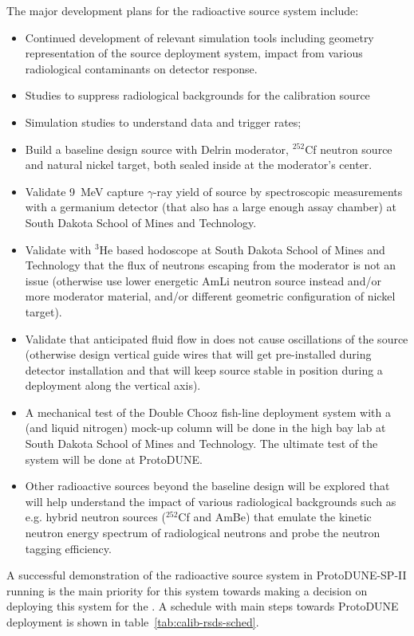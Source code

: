 The major development plans for the radioactive source system include:
\begin{itemize}
\item Continued development of relevant simulation tools including geometry representation of the source deployment system, impact from various radiological contaminants on detector response. 
\item Studies to suppress radiological backgrounds for the calibration source
\item Simulation studies to understand data and trigger rates;
\item Build a baseline design source with Delrin moderator, $^{252}$Cf neutron source and natural nickel target, both sealed inside at the moderator's center.
\item Validate \SI{9}{\MeV} capture $\gamma$-ray yield of source by spectroscopic measurements with a germanium detector (that also has a large enough assay chamber) at South Dakota School of Mines and Technology.
\item Validate with $^{3}$He based hodoscope at South Dakota School of Mines and Technology that the flux of neutrons escaping from the moderator is not an issue (otherwise use lower energetic AmLi neutron source instead and/or more moderator material, and/or different geometric configuration of nickel target). 
\item Validate that anticipated fluid flow in  does not cause oscillations of the source (otherwise design vertical guide wires that will get pre-installed during detector installation and that will keep source stable in position during a deployment along the vertical axis).
\item A mechanical test of the Double Chooz fish-line deployment system with a  (and liquid nitrogen) mock-up column will be done in the high bay lab at South Dakota School of Mines and Technology. The ultimate test of the system will be done at ProtoDUNE. 
\item Other radioactive sources beyond the baseline design will be explored that will help understand the impact of various radiological backgrounds such as e.g. hybrid neutron sources ($^{252}$Cf and AmBe) that emulate the kinetic neutron energy spectrum of radiological neutrons and probe the neutron tagging efficiency.
\end{itemize}

A successful demonstration of the radioactive source system in ProtoDUNE-SP-II running is the main priority for this system towards making a decision on deploying this system for the . A schedule with main steps towards ProtoDUNE deployment is shown in table~\ref{tab:calib-rsds-sched}.

